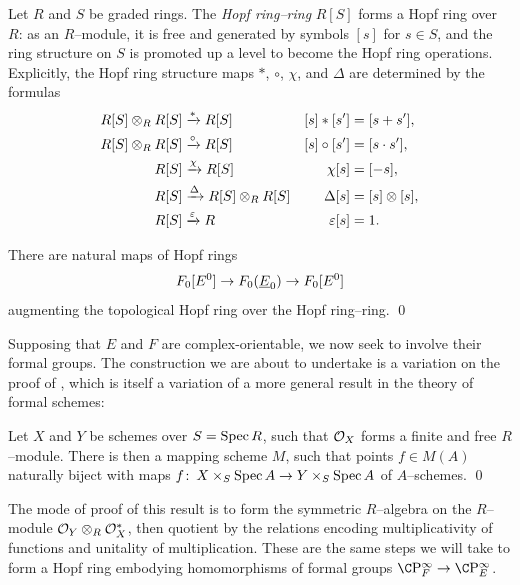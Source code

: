 \begin{definition}
Let \(R\) and \(S\) be graded rings.
The \textit{Hopf ring--ring} \(R[S]\) forms a Hopf ring over \(R\): as an \(R\)--module, it is free and generated by symbols \([s]\) for \(s \in S\), and the ring structure on \(S\) is promoted up a level to become the Hopf ring operations.
Explicitly, the Hopf ring structure maps \(\ast\), \(\circ\), \(\chi\), and \(\Delta\) are determined by the formulas
\begin{align*}
R[S] \otimes_R R[S] & \xrightarrow{\ast} R[S] & [s] \ast [s'] & = [s + s'], \\
R[S] \otimes_R R[S] & \xrightarrow{\circ} R[S] & [s] \circ [s'] & = [s \cdot s'], \\
R[S] & \xrightarrow{\chi} R[S] & \chi [s] & = [-s], \\
R[S] & \xrightarrow{\Delta} R[S] \otimes_R R[S] & \Delta [s] & = [s] \otimes [s], \\
R[S] & \xrightarrow{\varepsilon} R & \varepsilon[s] & = 1.
\end{align*}
\end{definition}

\begin{lemma}
There are natural maps of Hopf rings \[F_0[E^0] \to F_0(\OS{E}{0}) \to F_0[E^0]\] augmenting the topological Hopf ring over the Hopf ring--ring. \qed
\end{lemma}

Supposing that \(E\) and \(F\) are complex-orientable, we now seek to involve their formal groups.
The construction we are about to undertake is a variation on the proof of , which is itself a variation of a more general result in the theory of formal schemes:
\begin{lemma}\label{MappingSchemeStatement}
Let \(X\) and \(Y\) be schemes over \(S = \operatorname{Spec} R\), such that \(\mathcal{O}_X\) forms a finite and free \(R\)--module.
There is then a mapping scheme \(M\), such that points \(f \in M(A)\) naturally biject with maps \(f\colon\thinspace X \times_S \operatorname{Spec} A \to Y \times_S \operatorname{Spec} A\) of \(A\)--schemes. \qed
\end{lemma}

\noindent The mode of proof of this result is to form the symmetric \(R\)--algebra on the \(R\)--module \(\mathcal{O}_Y \otimes_R \mathcal{O}_X^*\), then quotient by the relations encoding multiplicativity of functions and unitality of multiplication.
These are the same steps we will take to form a Hopf ring embodying homomorphisms of formal groups \(\CP^\infty_F \to \CP^\infty_E\).

